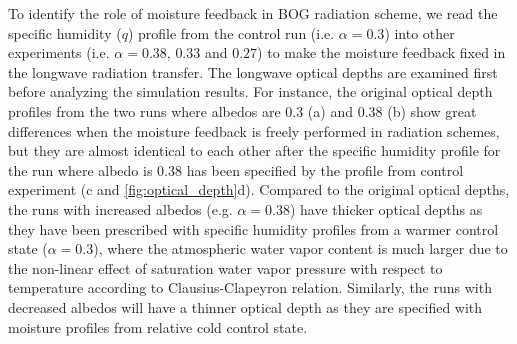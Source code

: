 To identify the role of moisture feedback in BOG radiation scheme, we read the specific humidity ($q$) profile from the control run (i.e. $\alpha=0.3$) into other experiments (i.e. $\alpha=0.38$, $0.33$ and $0.27$) to make the moisture feedback fixed in the longwave radiation transfer. The longwave optical depths are examined first before analyzing the simulation results. For instance, the original optical depth profiles from the two runs where albedos are 0.3 (a) and 0.38 (b) show great differences when the moisture feedback is freely performed in radiation schemes, but they are almost identical to each other after the specific humidity profile for the run where albedo is 0.38 has been specified by the profile from control experiment (c and \ref{fig:optical_depth}d). Compared to the original optical depths, the runs with increased albedos (e.g. $\alpha=0.38$) have thicker optical depths as they have been prescribed with specific humidity profiles from a warmer control state ($\alpha=0.3$), where the atmospheric water vapor content is much larger due to the non-linear effect of saturation water vapor pressure with respect to temperature according to Clausius-Clapeyron relation. Similarly, the runs with decreased albedos will have a thinner optical depth as they are specified with moisture profiles from relative cold control state.


